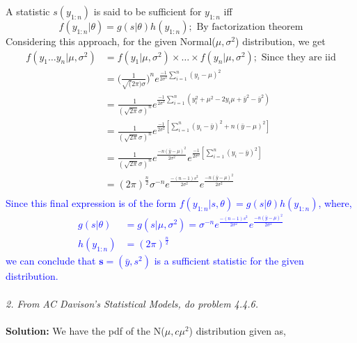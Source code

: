 \documentclass[11pt]{article}
\begin{document}
A statistic $s(y_{1:n})$ is said to be sufficient for $y_{1:n}$ iff
\begin{equation}
  \nonumber
  f(y_{1:n} | \theta) = g(s | \theta)h(y_{1:n}); \text{ By factorization theorem}
\end{equation}
Considering this approach, for the given Normal($\mu, \sigma^{2}$) distribution, we get
\begin{equation}
  \nonumber
  \begin{aligned}
    f(y_{1} \dots y_{n} | \mu, \sigma^{2}) & = f(y_{1}| \mu, \sigma^{2})\times \dots \times f(y_{n} | \mu, \sigma^{2}); \text{ Since they are iid}\\
    & = \bigg(\frac{1}{\sqrt(2 \pi) \sigma}\bigg)^{n} e^{\frac{-1}{2\sigma^{2}} \sum_{i = 1}^{n}(y_{i} - \mu)^{2}}\\
    & = \frac{1}{(\sqrt{2 \pi} \sigma)^{n}}e^{\frac{-1}{2 \sigma^{2}}\sum_{i = 1}^{n}(y_{i}^{2} + \mu^{2} - 2 y_{i} \mu + \bar{y}^{2} - \bar{y}^{2})}\\
    & = \frac{1}{(\sqrt{2 \pi} \sigma)^{n}}e^{\frac{-1}{2\sigma^{2}}[\sum_{i = 1}^{n}(y_{i} - \bar{y})^{2} + n(\bar{y} - \mu)^{2}]}\\
    & = \frac{1}{(\sqrt{2 \pi} \sigma)^{n}}e^{\frac{-n(\bar{y} - \mu)^{2}}{2 \sigma^{2}}}e^{\frac{-1}{2\sigma^{2}}[\sum_{i = 1}^{n}(y_{i} - \bar{y})^{2}]}\\
    & = (2\pi)^{\frac{n}{2}}\sigma^{-n}e^{\frac{-(n-1)s^2}{2\sigma^2}}e^{\frac{-n(\bar{y} - \mu)^2}{2\sigma^2}}\\
  \end{aligned}
\end{equation}
\textcolor{blue}{Since this final expression is of the form $f(y_{1:n} | s, \theta) = g(s | \theta)h(y_{1:n})$, where,
\begin{equation}
  \nonumber
  \begin{aligned}
    g(s | \theta) & = g(s | \mu, \sigma^{2}) = \sigma^{-n}e^{\frac{-(n-1)s^2}{2\sigma^2}}e^{\frac{-n(\bar{y} - \mu)^2}{2\sigma^2}}\\
    h(y_{1:n}) & = (2\pi)^{\frac{n}{2}}
  \end{aligned}
\end{equation}
we can conclude that $\mathbf{s} = (\bar{y}, s^{2})$ is a sufficient statistic for the given distribution.} \\ \\
\noindent \emph{2. From AC Davison’s Statistical Models, do problem 4.4.6.}\\ \\
\textbf{Solution:} We have the pdf of the N($\mu, c \mu^{2}$) distribution given as,
\end{document}
